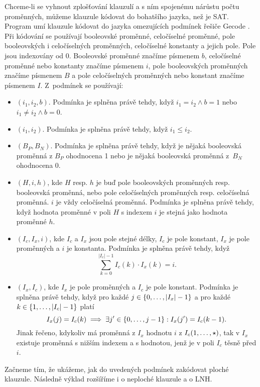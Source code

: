 {Chceme-li se vyhnout zplošťování klauzulí a s ním spojenému nárůstu počtu
proměnných, můžeme klauzule kódovat do bohatšího jazyka, než je SAT.
Program \crossbow{} umí klauzule kódovat do jazyka
omezujících podmínek řešiče Gecode \cite{gecode}.
Při kódování se používají booleovské proměnné, celočíselné proměnné,
pole booleovských i celočíselných proměnných, celočíselné konstanty
a jejich pole. Pole jsou indexovány od 0.
Booleovské proměnné značíme písmenem
$b$, celočíselné proměnné nebo konstanty značíme písmenem $i$,
pole booleovských proměnných značíme písmenem $B$
a pole celočíselných proměnných nebo konstant značíme písmenem $I$.
Z~podmínek se používají:
\begin{itemize}
\item \Eq$(i_1, i_2, b)$. Podmínka je splněna právě tehdy,
  když $i_1 = i_2 \wedge b = 1$ nebo $i_1 \neq i_2 \wedge b = 0$.
\item \LowerEq$(i_1, i_2)$. Podmínka je splněna právě tehdy,
  když $i_1 \le i_2$.
\item \Clause$(B_P, B_N)$. Podmínka je splněna právě tehdy,
  když je nějaká booleovská proměnná z $B_P$ ohodnocena 1
  nebo je nějaká booleovská proměnná z~$B_N$ ohodnocena 0.
\item \Element$(H, i, h)$, kde $H$ resp. $h$ je buď pole booleovských
  proměnných resp. booleovská proměnná, nebo pole celočíselných proměnných
  resp. celo\-číselná proměnná. $i$ je vždy celočíselná proměnná.
  Podmínka je splněna právě tehdy,
  když hodnota proměnné v poli $H$ s indexem $i$ je stejná jako
  hodnota proměnné $h$.
\item \Linear$(I_c, I_x, i)$, kde $I_c$ a $I_x$ jsou pole stejné délky,
  $I_c$ je pole konstant, $I_x$ je pole proměnných a $i$ je konstanta.
  Podmínka je splněna právě tehdy, když
  \[
    \sum^{|I_c|-1}_{k=0} I_c(k) \cdot I_x(k) = i.
  \]
\item \Precede$(I_x, I_c)$, kde $I_x$ je pole proměnných a
  $I_c$ je pole konstant. Podmínka je splněna právě tehdy, když
  pro každé $j \in \{ 0 , \ldots, |I_x| - 1 \}$ a pro každé
  $k \in \{ 1 , \ldots, |I_c| - 1 \}$ platí
  \[
    I_x(j) = I_c(k) \implies
      \exists j' \in \{ 0 , \ldots, j - 1 \}: I_x(j') = I_c(k - 1).
  \]
  Jinak řečeno, kdykoliv má proměnná z $I_x$ hodnotu $i$
  z $I_c(1 , \ldots, \star)$, tak v $I_x$ existuje proměnná
  s nižším indexem a s hodnotou, jenž je v poli $I_c$ těsně před $i$.
\end{itemize}

Začneme tím, že ukážeme, jak do uvedených podmínek zakódovat
ploché klauzule. Následně výklad rozšíříme i o neploché klauzule
a o LNH.

}
